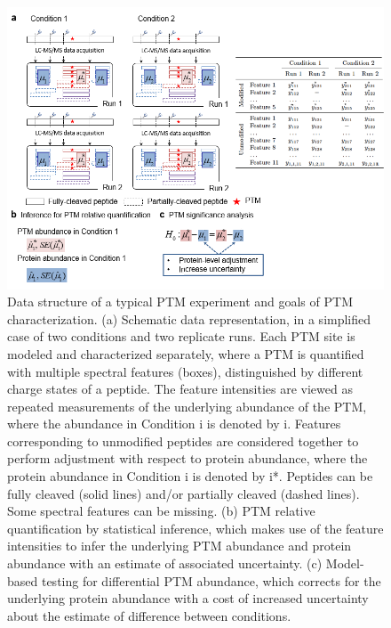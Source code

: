 \documentclass[mcp]{article}
\numberwithin{figure}{section} %
\numberwithin{table}{section}
\begin{document}
\begin{figure}[ht]
\centering
\includegraphics[scale=.8]{images/fig3.png}
\caption{
Data structure of a typical PTM experiment and goals of PTM characterization. (a) Schematic data representation, in a simplified case of two conditions and two replicate runs. Each PTM site is modeled and characterized separately, where a PTM is quantified with multiple spectral features (boxes), distinguished by different charge states of a peptide. The feature intensities are viewed as repeated measurements of the underlying abundance of the PTM, where the abundance in Condition i is denoted by i. Features corresponding to unmodified peptides are considered together to perform adjustment with respect to protein abundance, where the protein abundance in Condition i is denoted by i*. Peptides can be fully cleaved (solid lines) and/or partially cleaved (dashed lines). Some spectral features can be missing. (b) PTM relative quantification by statistical inference, which makes use of the feature intensities to infer the underlying PTM abundance and protein abundance with an estimate of associated uncertainty. (c) Model-based testing for differential PTM abundance, which corrects for the underlying protein abundance with a cost of increased uncertainty about the estimate of difference between conditions.}
\label{fig:data-structure}
\end{figure}
\end{document}
